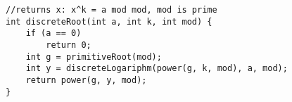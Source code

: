 \begin{verbatim}
//returns x: x^k = a mod mod, mod is prime
int discreteRoot(int a, int k, int mod) { 
	if (a == 0)
		return 0;
	int g = primitiveRoot(mod);
	int y = discreteLogariphm(power(g, k, mod), a, mod);
	return power(g, y, mod);	
}
\end{verbatim}
